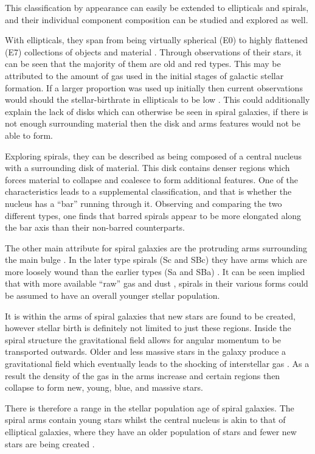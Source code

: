 \documentclass[12pt, twocolumn]{revtex4}    %
\begin{document}
This classification by appearance can easily be extended to ellipticals and spirals, and their individual component composition can be studied and explored as well. 

With ellipticals, they span from being virtually spherical (E0) to highly flattened (E7) collections of objects and material \cite{moore_databook}. Through observations of their stars, it can be seen that the majority of them are old and red types. This may be attributed to the amount of gas used in the initial stages of galactic stellar formation. If a larger proportion was used up initially then current observations would should the stellar-birthrate in ellipticals to be low \cite{carroll_astro}. This could additionally explain the lack of disks which can otherwise be seen in spiral galaxies, if there is not enough surrounding material then the disk and arms features would not be able to form.

Exploring spirals, they can be described as being composed of a central nucleus with a surrounding disk of material. This disk contains denser regions which forces material to collapse and coalesce to form additional features. One of the characteristics leads to a supplemental classification, and that is whether the nucleus has a ``bar'' running through it. Observing and comparing the two different types, one finds that barred spirals appear to be more elongated along the bar axis than their non-barred counterparts. 

The other main attribute for spiral galaxies are the protruding arms surrounding the main bulge \cite{carroll_astro}. In the later type spirals (Sc and SBc) they have arms which are more loosely wound than the earlier types (Sa and SBa) \cite{moore_databook}. It can be seen implied that with more available ``raw'' gas and dust \cite{carroll_astro}, spirals in their various forms could be assumed to have an overall younger stellar population.

It is within the arms of spiral galaxies that new stars are found to be created, however stellar birth is definitely not limited to just these regions. Inside the spiral structure the gravitational field allows for angular momentum to be transported outwards. Older and less massive stars in the galaxy produce a gravitational field which eventually leads to the shocking of interstellar gas \cite{binney_galaxies}. As a result the density of the gas in the arms increase and certain regions then collapse to form new, young, blue, and massive stars. 

There is therefore a range in the stellar population age of spiral galaxies. The spiral arms contain young stars whilst the central nucleus is akin to that of elliptical galaxies, where they have an older population of stars and fewer new stars are being created \cite{carroll_astro, binney_galaxies}.
\end{document}
